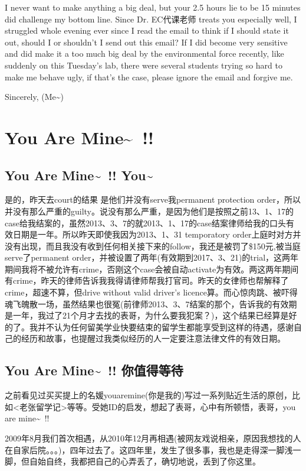 \documentclass[12pt]{book}
\begin{document}
I never want to make anything a big deal, but your 2.5 hours lie to be 15 minutes did challenge my bottom line. Since Dr. EC代课老师 treats you especially well, I struggled whole evening ever since I read the email to think if I should state it out, should I or shouldn't I send out this email? If I did become very sensitive and did make it a too much big deal by the environmental force recently, like suddenly on this Tuesday's lab, there were several students trying so hard to make me behave ugly, if that's the case, please ignore the email and forgive me. 

Sincerely, 
(Me\textasciitilde{})

\chapter{You Are Mine\textasciitilde{}~!!}
\label{sec-19}
\section{You Are Mine\textasciitilde{}~!! You\textasciitilde{}}
\label{sec-19-1}
是的，昨天去court的结果 是他们并没有serve我permanent protection order，所以并没有那么严重的guilty。说没有那么严重，是因为他们是按照之前13、1、17的case给我结案的，虽然2013、3、7的就2013、1、17的case结案律师给我的口头有效日期是一年。所以昨天即使我因为2013、1、31 temporatory order上庭时对方并没有出现，而且我没有收到任何相关接下来的follow，我还是被罚了\$150元,被当庭serve了permanent order，并被设置了两年(有效期到2017、3、21)的trial，这两年期间我将不被允许有crime，否刚这个case会被自动activate为有效。两这两年期间有crime，昨天的律师告诉我我得请律师帮我打官司。昨天的女律师也帮解释了crime，超速不算，但drive without valid driver's licence算。而心惊肉跳、被吓得魂飞魄散一场，虽然结果也很冤(前律师2013、3、7结案的那个，告诉我的有效期是一年，我过了21个月才去找的表哥，为什么要我犯案？)，这个结果已经算是好的了。我并不认为任何留美学业快要结束的留学生都能享受到这样的待遇，感谢自己的经历和故事，也提醒过我类似经历的人一定要注意法律文件的有效日期。
\section{You Are Mine\textasciitilde{}~!! 你值得等待}
\label{sec-19-2}
之前看见过买买提上的名媛youaremine(你是我的)写过一系列贴近生活的原创，比如<老张留学记>等等。受她ID的启发，想起了表哥，心中有所顿悟，表哥，you are mine\textasciitilde{}~!!

2009年8月我们首次相遇，从2010年12月再相遇(被网友戏说相亲，原因我想找的人在自家后院。。。)，四年过去了。这四年里，发生了很多事，我也是走得深一脚浅一脚，但自始自终，我都把自己的心弄丢了，确切地说，丢到了你这里。
\end{document}
